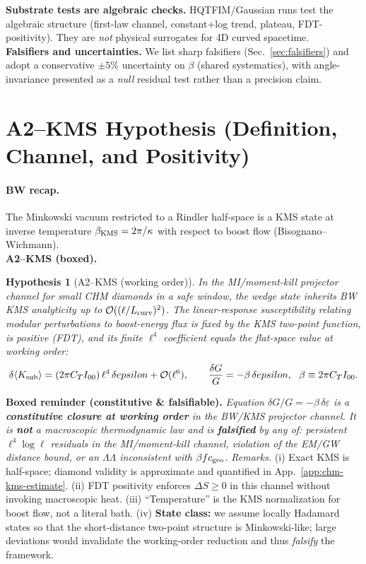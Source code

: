 \documentclass[aps,prd,onecolumn,superscriptaddress,nofootinbib]{revtex4-2}
\def\eps{epsilon}%
\def\Omega_\Lambda{OmegaLambda}%
\providecommand{\eps}{\varepsilon}
\newtheorem{hypothesis}{Hypothesis}
\begin{document}
\noindent\textbf{Substrate tests are algebraic checks.} HQTFIM/Gaussian runs test the algebraic structure (first-law channel, constant+log trend, plateau, FDT-positivity). They are \emph{not} physical surrogates for 4D curved spacetime.\\[3pt]
\noindent\textbf{Falsifiers and uncertainties.} We list sharp falsifiers (Sec.~\ref{sec:falsifiers}) and adopt a conservative $\pm 5\%$ uncertainty on $\beta$ (shared systematics), with angle-invariance presented as a \emph{null} residual test rather than a precision claim.

\section{A2–KMS Hypothesis (Definition, Channel, and Positivity)}
\label{sec:A2KMS}
\paragraph{BW recap.} The Minkowski vacuum restricted to a Rindler half-space is a KMS state at inverse temperature $\beta_{\rm KMS}=2\pi/\kappa$ with respect to boost flow (Bisognano–Wichmann).\\[3pt]
\noindent\textbf{A2–KMS (boxed).}
\begin{hypothesis}[A2–KMS (working order)]
\label{hyp:A2KMS}
In the MI/moment-kill projector channel for small CHM diamonds in a safe window, the wedge state inherits BW KMS analyticity up to $\mathcal O((\ell/L_{\rm curv})^2)$. The linear-response susceptibility relating modular perturbations to boost-energy flux is fixed by the KMS two-point function, is positive (FDT), and its finite $\ell^4$ coefficient equals the flat-space value at working order:
\[
\delta\langle K_{\rm sub}\rangle=(2\pi C_T I_{00})\,\ell^4\,\delta\eps+\mathcal O(\ell^6),\qquad
\frac{\delta G}{G}=-\beta\,\delta\eps,\ \ \beta\equiv 2\pi C_T I_{00}.
\]
\end{hypothesis}
\noindent\textbf{Boxed reminder (constitutive \& falsifiable).} \emph{Equation $\delta G/G=-\beta\,\delta\varepsilon$ is a \textbf{constitutive closure at working order} in the BW/KMS projector channel. It is \textbf{not} a macroscopic thermodynamic law and is \textbf{falsified} by any of: persistent $\ell^4\log\ell$ residuals in the MI/moment-kill channel, violation of the EM/GW distance bound, or an $\Omega_\Lambda$ inconsistent with $\beta f c_{\rm geo}$.}
\noindent\emph{Remarks.} (i) Exact KMS is half-space; diamond validity is approximate and quantified in App.~\ref{app:chm-kms-estimate}. (ii) FDT positivity enforces $\Delta S\ge 0$ in this channel without invoking macroscopic heat. (iii) ``Temperature'' is the KMS normalization for boost flow, not a literal bath. (iv) \textbf{State class:} we assume locally Hadamard states so that the short-distance two-point structure is Minkowski-like; large deviations would invalidate the working-order reduction and thus \emph{falsify} the framework.
\end{document}
